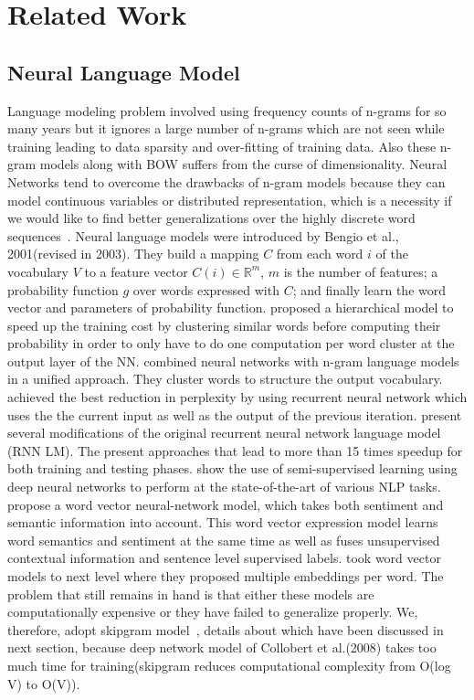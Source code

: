 \documentclass[11pt,a4paper]{article}
\begin{document}
\section{Related Work}
\subsection{Neural Language Model}
Language modeling problem involved using frequency counts of n-grams for so many years but it ignores a large number of n-grams which are not seen while training leading to data sparsity and over-fitting of training data. Also these n-gram models along with BOW suffers from the curse of dimensionality. Neural Networks tend to overcome the drawbacks of n-gram models because they can model continuous variables or distributed representation, which is a necessity if we would like to find better generalizations over the highly discrete word sequences~\cite{Bengio:03}. 
Neural language models were introduced by Bengio et al., 2001(revised in 2003\cite{Bengio:03}). They build a mapping $C$ from each word $i$ of the vocabulary $V$ to a feature vector $C(i) \in \mathbb{R}^m$, $m$ is the number of features; a probability function $g$ over words expressed with $C$; and finally learn the word vector and parameters of probability function.
\cite{Morin:05} proposed a hierarchical model to speed up the training cost by clustering similar words before computing their probability in order to only have to do one computation per word cluster
at the output layer of the NN.
\cite{Le:11} combined neural networks with n-gram language models in a unified approach. They cluster words to structure the output vocabulary. \cite{Mikolov:10} achieved the best reduction in perplexity by using recurrent neural network which uses the the current input as well as the output of the previous iteration.
\cite{Mikolov:11} present several modifications of the original recurrent neural network language model (RNN LM). The present approaches that lead to more than 15 times speedup for both training and testing phases.
\cite{Collobert:08} show the use of semi-supervised learning using deep neural networks to perform at the state-of-the-art of various NLP tasks. \cite{Wang:14} propose a word vector neural-network model, which takes both sentiment and semantic information into account. This word vector expression model learns word semantics and sentiment at the same time as well as fuses unsupervised contextual information and sentence level supervised labels. \cite{Neelakantan:14} took word vector models to next level where they proposed multiple embeddings per word.
The problem that still remains in hand is that either these models are computationally expensive or they have failed to generalize properly. We, therefore, adopt skipgram model~\cite{Mikolov:13a}, details about which have been discussed in next section, because deep network model of Collobert et al.(2008) takes too much time for training(skipgram reduces computational complexity from O(log V) to O(V)).
\end{document}
